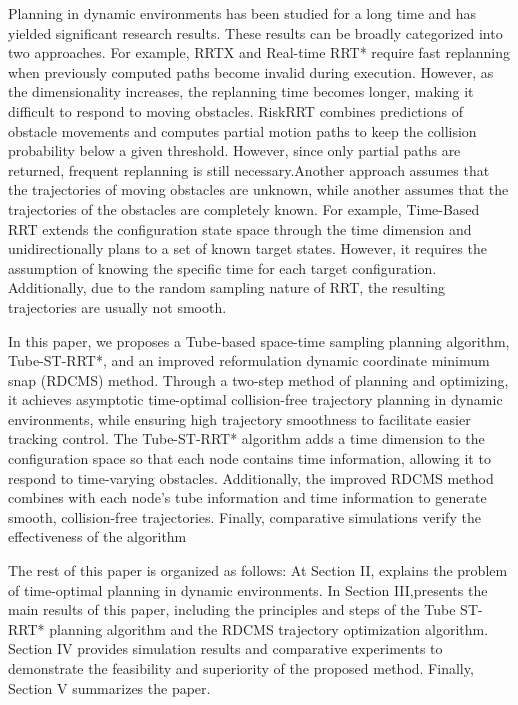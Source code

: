 \documentclass[conference]{IEEEtran}
\begin{document}
        Planning in dynamic environments has been studied for a long time and has yielded significant research results. These results can be broadly categorized into two approaches. For example, RRTX\cite{b3} and Real-time RRT* \cite{b4} require fast replanning when previously computed paths become invalid during execution. However, as the dimensionality increases, the replanning time becomes longer, making it difficult to respond to moving obstacles. RiskRRT \cite{b5} combines predictions of obstacle movements and computes partial motion paths to keep the collision probability below a given threshold. However, since only partial paths are returned, frequent replanning is still necessary.Another approach assumes that the trajectories of moving obstacles are unknown, while another assumes that the trajectories of the obstacles are completely known. For example, Time-Based RRT \cite{b6} extends the configuration state space through the time dimension and unidirectionally plans to a set of known target states. However, it requires the assumption of knowing the specific time for each target configuration. Additionally, due to the random sampling nature of RRT, the resulting trajectories are usually not smooth.

        In this paper, we proposes a Tube-based space-time sampling planning algorithm, Tube-ST-RRT*, and an improved reformulation dynamic coordinate minimum snap (RDCMS) method. Through a two-step method of  planning and optimizing, it achieves asymptotic time-optimal collision-free trajectory planning in dynamic environments, while ensuring high trajectory smoothness to facilitate easier tracking control. The Tube-ST-RRT* algorithm adds a time dimension to the configuration space so that each node contains time information, allowing it to respond to time-varying obstacles. Additionally, the improved RDCMS method combines with each node's tube information and time information to generate smooth, collision-free trajectories. Finally, comparative simulations verify the effectiveness of the algorithm

        The rest of this paper is organized as follows: At Section II, explains the problem of time-optimal planning in dynamic environments. In Section III,presents the main results of this paper, including the principles and steps of the Tube ST-RRT* planning algorithm and the RDCMS trajectory optimization algorithm. Section IV provides simulation results and comparative experiments to demonstrate the feasibility and superiority of the proposed method. Finally, Section V summarizes the paper.
\end{document}

